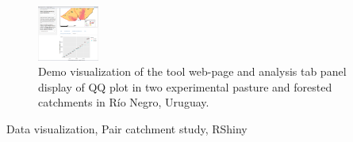 \documentclass[a4paper,fleqn]{article} %
\begin{document}
\begin{figure}[b]
\centering
\includegraphics[width = 2cm,clip=true,scale = 0.3]{prototype_shiny.png}
\caption{Demo visualization of the tool web-page and analysis tab panel display of QQ plot in two experimental pasture and forested catchments in Río Negro, Uruguay.}
\end{figure}
\begin{keyword}
Data visualization, Pair catchment study, RShiny 
\end{keyword}

\maketitle





	
\end{document}
